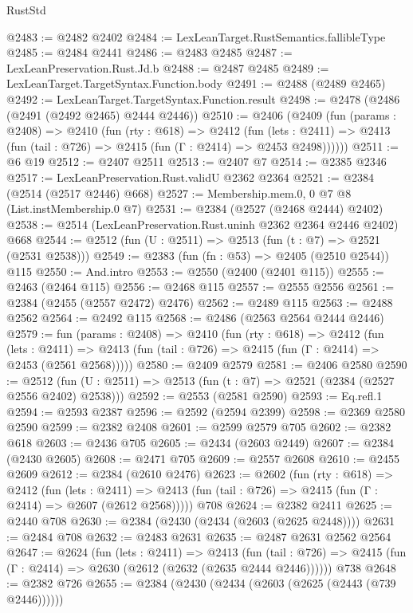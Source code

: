 \begin{lexlean}{RustStd}
\begin{coremodule}
@2483 := @2482 @2402
@2484 := LexLeanTarget.RustSemantics.fallibleType
@2485 := @2484 @2441
@2486 := @2483 @2485
@2487 := LexLeanPreservation.Rust.Jd.b
@2488 := @2487 @2485
@2489 := LexLeanTarget.TargetSyntax.Function.body
@2491 := @2488 (@2489 @2465)
@2492 := LexLeanTarget.TargetSyntax.Function.result
@2498 := @2478 (@2486 (@2491 (@2492 @2465) @2444 @2446))
@2510 := @2406
    (@2409
      (fun (params : @2408) =>
      @2410
        (fun (rty : @618) =>
        @2412
          (fun (lets : @2411) =>
          @2413 (fun (tail : @726) => @2415 (fun (Γ : @2414) => @2453 @2498))))))
@2511 := @6 @19
@2512 := @2407 @2511
@2513 := @2407 @7
@2514 := @2385 @2346
@2517 := LexLeanPreservation.Rust.validU @2362 @2364
@2521 := @2384 (@2514 (@2517 @2446) @668)
@2527 := Membership.mem.{0, 0} @7 @8 (List.instMembership.{0} @7)
@2531 := @2384 (@2527 (@2468 @2444) @2402)
@2538 := @2514 (LexLeanPreservation.Rust.uninh @2362 @2364 @2446 @2402) @668
@2544 := @2512 (fun (U : @2511) => @2513 (fun (t : @7) => @2521 (@2531 @2538)))
@2549 := @2383 (fun (fn : @53) => @2405 (@2510 @2544)) @115
@2550 := And.intro
@2553 := @2550 (@2400 (@2401 @115))
@2555 := @2463 (@2464 @115)
@2556 := @2468 @115
@2557 := @2555 @2556
@2561 := @2384 (@2455 (@2557 @2472) @2476)
@2562 := @2489 @115
@2563 := @2488 @2562
@2564 := @2492 @115
@2568 := @2486 (@2563 @2564 @2444 @2446)
@2579 := fun (params : @2408) =>
  @2410
    (fun (rty : @618) =>
    @2412
      (fun (lets : @2411) =>
      @2413 (fun (tail : @726) => @2415 (fun (Γ : @2414) => @2453 (@2561 @2568)))))
@2580 := @2409 @2579
@2581 := @2406 @2580
@2590 := @2512 (fun (U : @2511) => @2513 (fun (t : @7) => @2521 (@2384 (@2527 @2556 @2402) @2538)))
@2592 := @2553 (@2581 @2590)
@2593 := Eq.refl.{1}
@2594 := @2593 @2387
@2596 := @2592 (@2594 @2399)
@2598 := @2369 @2580 @2590
@2599 := @2382 @2408
@2601 := @2599 @2579 @705
@2602 := @2382 @618
@2603 := @2436 @705
@2605 := @2434 (@2603 @2449)
@2607 := @2384 (@2430 @2605)
@2608 := @2471 @705
@2609 := @2557 @2608
@2610 := @2455 @2609
@2612 := @2384 (@2610 @2476)
@2623 := @2602
    (fun (rty : @618) =>
    @2412
      (fun (lets : @2411) =>
      @2413 (fun (tail : @726) => @2415 (fun (Γ : @2414) => @2607 (@2612 @2568)))))
    @708
@2624 := @2382 @2411
@2625 := @2440 @708
@2630 := @2384 (@2430 (@2434 (@2603 (@2625 @2448))))
@2631 := @2484 @708
@2632 := @2483 @2631
@2635 := @2487 @2631 @2562 @2564
@2647 := @2624
    (fun (lets : @2411) =>
    @2413
      (fun (tail : @726) => @2415 (fun (Γ : @2414) => @2630 (@2612 (@2632 (@2635 @2444 @2446))))))
    @738
@2648 := @2382 @726
@2655 := @2384 (@2430 (@2434 (@2603 (@2625 (@2443 (@739 @2446))))))

\end{coremodule}
\end{lexlean}
